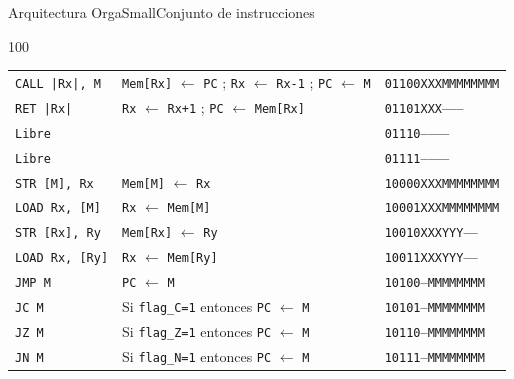 \documentclass[aspectratio=169]{beamer}
\begin{document}
\begin{frame}[fragile,t]{Arquitectura OrgaSmall}{Conjunto de instrucciones}
\begin{textblock}{100}
\begin{tabular}{l|l|l}
    \texttt{CALL |Rx|, M}  & \texttt{Mem[Rx]} $\leftarrow$ \texttt{PC} ; \texttt{Rx} $\leftarrow$ \texttt{Rx-1} ; \texttt{PC} $\leftarrow$ \texttt{M}   & \texttt{\textcolor{r}{01100}\textcolor{v}{XXX}\textcolor{a}{MMMMMMMM}} \\  %
    \texttt{RET  |Rx|}     & \texttt{Rx} $\leftarrow$ \texttt{Rx+1} ; \texttt{PC} $\leftarrow$ \texttt{Mem[Rx]}  & \texttt{\textcolor{r}{01101}\textcolor{v}{XXX}\textcolor{gray}{--------}} \\  %
    \hline
    \texttt{Libre}         &                                                                    & \texttt{\textcolor{r}{01110}\textcolor{gray}{-----------}} \\  %
    \texttt{Libre}         &                                                                    & \texttt{\textcolor{r}{01111}\textcolor{gray}{-----------}} \\  %
    \hline
    \texttt{STR  [M], Rx}  & \texttt{Mem[M]} $\leftarrow$ \texttt{Rx}                           & \texttt{\textcolor{r}{10000}\textcolor{v}{XXX}\textcolor{a}{MMMMMMMM}} \\  %
    \texttt{LOAD Rx, [M]}  & \texttt{Rx} $\leftarrow$ \texttt{Mem[M]}                           & \texttt{\textcolor{r}{10001}\textcolor{v}{XXX}\textcolor{a}{MMMMMMMM}} \\  %
    \texttt{STR  [Rx], Ry} & \texttt{Mem[Rx]} $\leftarrow$ \texttt{Ry}                          & \texttt{\textcolor{r}{10010}\textcolor{v}{XXX}\textcolor{verde}{YYY}\textcolor{gray}{-----}} \\  %
    \texttt{LOAD Rx, [Ry]} & \texttt{Rx} $\leftarrow$ \texttt{Mem[Ry]}                          & \texttt{\textcolor{r}{10011}\textcolor{v}{XXX}\textcolor{verde}{YYY}\textcolor{gray}{-----}} \\  %
    \hline
    \texttt{JMP M}         & \texttt{PC} $\leftarrow$ \texttt{M}                                & \texttt{\textcolor{r}{10100}\textcolor{gray}{---}\textcolor{a}{MMMMMMMM}} \\  %
    \texttt{JC M}          & Si \texttt{flag\_C=1} entonces \texttt{PC} $\leftarrow$ \texttt{M} & \texttt{\textcolor{r}{10101}\textcolor{gray}{---}\textcolor{a}{MMMMMMMM}} \\  %
    \texttt{JZ M}          & Si \texttt{flag\_Z=1} entonces \texttt{PC} $\leftarrow$ \texttt{M} & \texttt{\textcolor{r}{10110}\textcolor{gray}{---}\textcolor{a}{MMMMMMMM}} \\  %
    \texttt{JN M}          & Si \texttt{flag\_N=1} entonces \texttt{PC} $\leftarrow$ \texttt{M} & \texttt{\textcolor{r}{10111}\textcolor{gray}{---}\textcolor{a}{MMMMMMMM}} \\  %

\end{tabular}
\end{textblock}
\end{frame}
\end{document}
